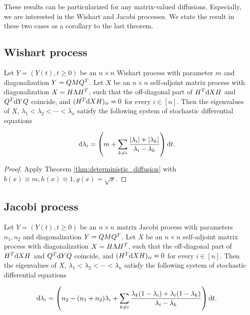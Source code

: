 These results can be particularized for any matrix-valued diffusions. Especially, we are interested in the Wishart and Jacobi processes. We state the result in these two cases as a corollary to the last theorem.

\subsection{Wishart process}

\begin{corollary}
    Let $Y = (Y(t), t \ge 0)$ be an $n\times n$ Wishart process with parameter $m$ and diagonalization $Y = QMQ^T$. Let $X$ be an $n\times n$ self-adjoint matrix process with diagonalization $X = H \Lambda H^T$, such that the off-diagonal part of $H^T \mathrm d X H $ and $Q^T \mathrm d Y Q$ coincide, and $(H^T \mathrm d X H)_{ii} = 0$ for every $i \in [n]$. Then the eigenvalues of $X$, $\lambda_1 < \lambda_2 < \cdots < \lambda_n$ satisfy the following system of stochastic differential equations

    \begin{equation} \label{eq:deterministic_wishart}
        \mathrm d \lambda_i = \left( m +\sum_{k\neq i} \frac{ \lvert \lambda_i \rvert + \lvert \lambda_k \rvert }{\lambda_i - \lambda_k}\right)\mathrm d t.
    \end{equation}
\end{corollary}

\begin{proof}
    Apply Theorem \ref{thm:deterministic_diffusion} with $b(x)\equiv m, h(x)\equiv 1, g(x)=\sqrt{x} $. 
\end{proof}


\subsection{Jacobi process}

\begin{corollary}
    Let $Y = (Y(t), t \ge 0)$ be an $n\times n$ matrix Jacobi process with parameters $n_1,n_2$ and diagonalization $Y = QMQ^T$. Let $X$ be an $n\times n$ self-adjoint matrix process with diagonalization $X = H \Lambda H^T$, such that the off-diagonal part of $H^T \mathrm d X H $ and $Q^T \mathrm d Y Q$ coincide, and $(H^T \mathrm d X H)_{ii} = 0$ for every $i \in [n]$. Then the eigenvalues of $X$, $\lambda_1 < \lambda_2 < \cdots < \lambda_n$ satisfy the following system of stochastic differential equations

    \begin{equation} \label{eq:deterministic_jacobi}
        \mathrm d \lambda_i = \left( n_2 - (n_1 + n_2)\lambda_i + \sum_{k\neq i} \frac{\lambda_k(1-\lambda_i) + \lambda_i(1-\lambda_k)}{\lambda_i - \lambda_k} \right)\mathrm d t.
    \end{equation}
\end{corollary}

